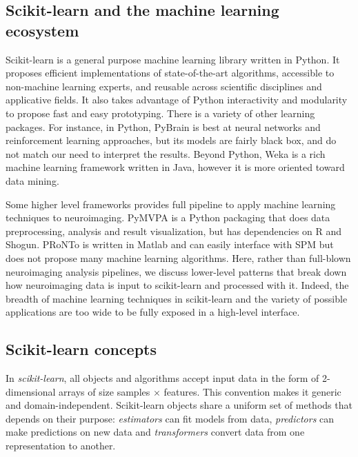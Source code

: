 \documentclass{frontiersSCNS} %
\begin{document}
\subsection{Scikit-learn and the machine learning ecosystem}

Scikit-learn \citep{pedregosa2011} is a general purpose machine learning
library written in Python.
It proposes efficient implementations of state-of-the-art algorithms,
accessible to non-machine learning experts,
and reusable across scientific disciplines and applicative fields. It also
takes advantage of Python interactivity and modularity to propose fast and easy
prototyping. There is a variety of other learning packages. For instance,
in Python, PyBrain \citep{schaul2010pybrain} is best at neural networks
and reinforcement learning approaches, but its models are fairly black box,
and do not match our need to interpret the results.
Beyond Python, Weka \citep{hall2009weka} is a rich machine learning framework
written in Java,
however it is more oriented toward data mining. 

Some higher level frameworks provides full pipeline to apply machine
learning techniques to neuroimaging. PyMVPA is a Python packaging that 
does data preprocessing,
analysis and result visualization, but has dependencies on R and Shogun.
PRoNTo \citep{schrouff2013pronto} is written in Matlab and can easily
interface with SPM but does not propose many machine learning algorithms.
Here, rather than full-blown neuroimaging analysis pipelines, we discuss lower-level patterns that break down how neuroimaging
data is input to scikit-learn and processed with it. Indeed, the breadth
of machine learning techniques in scikit-learn and the variety of
possible applications are too wide to be fully exposed in a high-level
interface.

\subsection{Scikit-learn concepts}
\label{scikitlearn}

In {\em scikit-learn}, all objects and algorithms accept input data in the form of
2-dimensional arrays of size samples $\times$ features.
This convention makes it generic and domain-independent.
Scikit-learn objects share a uniform set of methods that
depends on their purpose: \textit{estimators} can fit models from data,
\textit{predictors} can make predictions on new data and \textit{transformers}
convert data from one representation to another.
\end{document}
